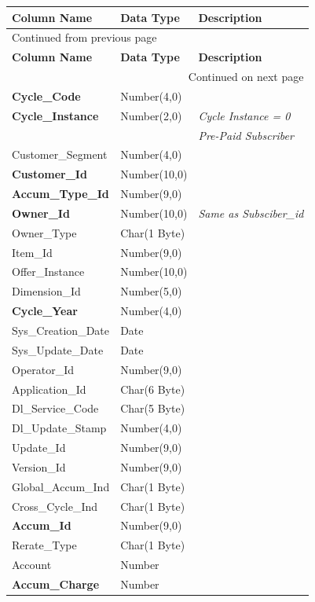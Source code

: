 \documentclass[12pt,twoside]{article}
\begin{document}
\begin{longtable}{l|l|l}
\hline
\textbf{Column Name} & \textbf{Data Type} & \textbf{Description}\\
\hline
\endfirsthead
\multicolumn{3}{l}{Continued from previous page} \\
\hline

\textbf{Column Name} & \textbf{Data Type} & \textbf{Description} \\

\hline
\endhead
\hline\multicolumn{3}{r}{Continued on next page} \\
\endfoot
\endlastfoot
\hline
\textbf{Cycle\_Code} & Number(4,0) & \\
\textbf{Cycle\_Instance} & Number(2,0) & \emph{Cycle Instance = 0}\\
&  & \emph{Pre-Paid Subscriber}\\
Customer\_Segment & Number(4,0) & \\
\textbf{Customer\_Id} & Number(10,0) & \\
\textbf{Accum\_Type\_Id} & Number(9,0) & \\
\textbf{Owner\_Id} & Number(10,0) & \emph{Same as Subsciber\_id}\\
Owner\_Type & Char(1 Byte) & \\
Item\_Id & Number(9,0) & \\
Offer\_Instance & Number(10,0) & \\
Dimension\_Id & Number(5,0) & \\
\textbf{Cycle\_Year} & Number(4,0) & \\
Sys\_Creation\_Date & Date & \\
Sys\_Update\_Date & Date & \\
Operator\_Id & Number(9,0) & \\
Application\_Id & Char(6 Byte) & \\
Dl\_Service\_Code & Char(5 Byte) & \\
Dl\_Update\_Stamp & Number(4,0) & \\
Update\_Id & Number(9,0) & \\
Version\_Id & Number(9,0) & \\
Global\_Accum\_Ind & Char(1 Byte) & \\
Cross\_Cycle\_Ind & Char(1 Byte) & \\
\textbf{Accum\_Id} & Number(9,0) & \\
Rerate\_Type & Char(1 Byte) & \\
Account & Number & \\
\textbf{Accum\_Charge} & Number & \\

\end{longtable}
\end{document}
